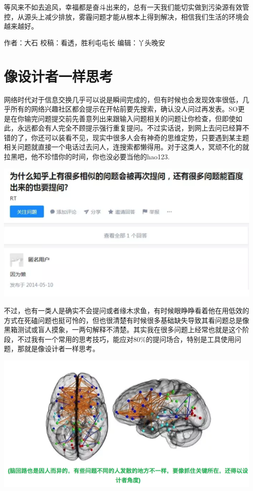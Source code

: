 \documentclass[]{book}
\begin{document}
等风来不如去追风，幸福都是奋斗出来的，总有一天我们能切实做到污染源有效管控，从源头上减少排放，雾霾问题才能从根本上得到解决，相信我们生活的环境会越来越好。

作者：大石 校稿：看透，胜利屯屯长 编辑：丫头晚安

\section{像设计者一样思考}

网络时代对于信息交换几乎可以说是瞬间完成的，但有时候也会发现效率很低，几乎所有的网络兴趣社区都会提示在开帖前要先搜索，确认没人问过再发表。SO更是在你输完问题提交前先善意列出来跟输入问题相关的问题让你检查，但即使如此，永远都会有人完全不顾提示强行重复提问。不过实话说，到网上去问已经算不错的了，你还可以装看不见，现实中很多人会有神奇的思维定势，只要遇到某主题相关问题就直接一个电话过去问人，连搜索都懒得用。对于这类人，冥顽不化的就拉黑吧，他不珍惜你的时间，你也没必要当他的hao123.

\includegraphics[width=8.33in]{images/sheji1}

不过，也有一类人是确实不会提问或者缘木求鱼，有时候眼睁睁看着他在用低效的方式在死磕问题也挺可怜的，但也很清楚有时候很多基础缺失导致其看问题总是像黑箱测试或盲人摸象，一两句解释不清楚。其实我在很多问题上经常也就是这个阶段，不过我有一个常用的思考技巧，能应对80\%的提问场合，特别是工具使用问题，那就是像设计者一样思考。

\includegraphics[width=8.33in]{images/sheji2}
\end{document}
